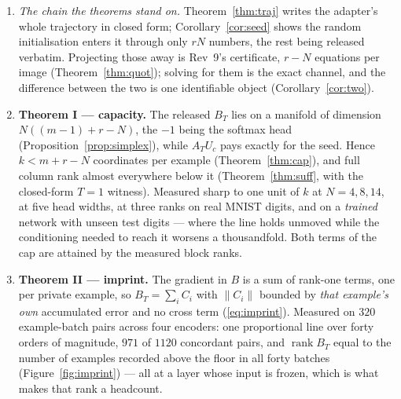 \begin{enumerate}\itemsep3pt
\item \emph{The chain the theorems stand on.} Theorem~\ref{thm:traj} writes
  the adapter's whole trajectory in closed form; Corollary~\ref{cor:seed}
  shows the random initialisation enters it through only $rN$ numbers, the
  rest being released verbatim. Projecting those away is Rev~9's
  certificate, $r-N$ equations per image (Theorem~\ref{thm:quot}); solving
  for them is the exact channel, and the difference between the two is one
  identifiable object (Corollary~\ref{cor:two}).

\item \textbf{Theorem I — capacity.} The released $B_T$ lies on a manifold
  of dimension $N((m-1)+r-N)$, the $-1$ being the softmax head
  (Proposition~\ref{prop:simplex}), while $A_TU_c$ pays exactly for the
  seed. Hence $k<m+r-N$ coordinates per example (Theorem~\ref{thm:cap}), and
  full column rank almost everywhere below it (Theorem~\ref{thm:suff}, with
  the closed-form $T=1$ witness). Measured sharp to one unit of $k$ at
  $N=4,8,14$, at five head widths, at three ranks on real MNIST digits, and
  on a \emph{trained} network with unseen test digits — where the line holds
  unmoved while the conditioning needed to reach it worsens a thousandfold.
  Both terms of the cap are attained by the measured block ranks.

\item \textbf{Theorem II — imprint.} The gradient in $B$ is a sum of
  rank-one terms, one per private example, so
  $B_T=\sum_iC_i$ with $\|C_i\|$ bounded by \emph{that example's own}
  accumulated error and no cross term (\eqref{eq:imprint}). Measured on
  $320$ example-batch pairs across four encoders: one proportional line over
  forty orders of magnitude, $971$ of $1120$ concordant pairs,
  and $\operatorname{rank}B_T$ equal to the number of examples recorded above
  the floor in all forty batches (Figure~\ref{fig:imprint}) --- all at a
  layer whose input is frozen, which is what makes that rank a headcount.


\end{enumerate}
